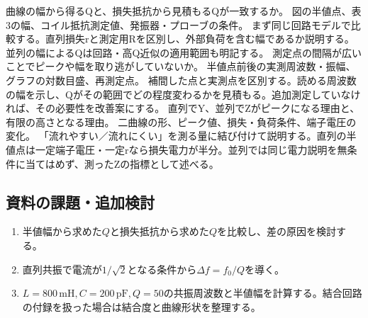\documentclass[lualatex,a4paper,10pt]{jlreq}
\begin{document}
{曲線の幅から得るQと、損失抵抗から見積もるQが一致するか。}
{図の半値点、表3の幅、コイル抵抗測定値、発振器・プローブの条件。}
{まず同じ回路モデルで比較する。直列損失rと測定用Rを区別し、外部負荷を含む幅であるか説明する。並列の幅によるQは回路・高Q近似の適用範囲も明記する。}
{測定点の間隔が広いことでピークや幅を取り逃がしていないか。}
{半値点前後の実測周波数・振幅、グラフの対数目盛、再測定点。}
{補間した点と実測点を区別する。読める周波数の幅を示し、Qがその範囲でどの程度変わるかを見積もる。追加測定していなければ、その必要性を改善案にする。}
{直列でY、並列でZがピークになる理由と、有限の高さとなる理由。}
{二曲線の形、ピーク値、損失・負荷条件、端子電圧の変化。}
{「流れやすい／流れにくい」を測る量に結び付けて説明する。直列の半値点は一定端子電圧・一定rなら損失電力が半分。並列では同じ電力説明を無条件に当てはめず、測ったZの指標として述べる。}
\subsection{資料の課題・追加検討}
\begin{enumerate}
\item 半値幅から求めた$Q$と損失抵抗から求めた$Q$を比較し、差の原因を検討する。
\item 直列共振で電流が$1/\sqrt2$となる条件から$\Delta f=f_0/Q$を導く。
\item $L=800\,\mathrm{mH},C=200\,\mathrm{pF},Q=50$の共振周波数と半値幅を計算する。結合回路の付録を扱った場合は結合度と曲線形状を整理する。
\end{enumerate}
\writing{25mm}
\end{document}
